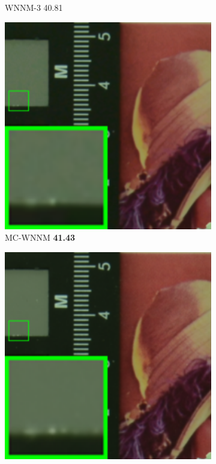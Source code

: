 \begin{figure}
\begin{subfigure}[t]{0.19\textwidth}
		\caption{WNNM-3 40.81}
    \end{subfigure}
    \hfill
    \begin{subfigure}[t]{0.19\textwidth}
        \centering
        \includegraphics[width=1\textwidth]{images/mcwnnm/cc/resize_br_CWNNM_ADMM_NL_CC15_d800_iso1600_2.png}
		\caption{MC-WNNM \textbf{41.43}}
    \end{subfigure}
    \hfill
    \begin{subfigure}[t]{0.19\textwidth}
        \centering
        \includegraphics[width=1\textwidth]{images/mcwnnm/cc/resize_br_d800_iso1600_2.png}

\end{subfigure}
\end{figure}
